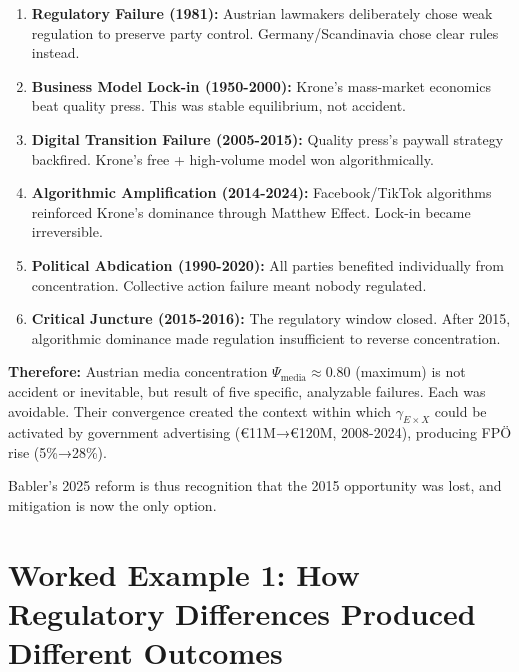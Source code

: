 {\begin{enumerate}
\item \textbf{Regulatory Failure (1981):} Austrian lawmakers deliberately chose weak regulation
  to preserve party control. Germany/Scandinavia chose clear rules instead.

\item \textbf{Business Model Lock-in (1950-2000):} Krone's mass-market economics beat quality
  press. This was stable equilibrium, not accident.

\item \textbf{Digital Transition Failure (2005-2015):} Quality press's paywall strategy backfired.
  Krone's free + high-volume model won algorithmically.

\item \textbf{Algorithmic Amplification (2014-2024):} Facebook/TikTok algorithms reinforced
  Krone's dominance through Matthew Effect. Lock-in became irreversible.

\item \textbf{Political Abdication (1990-2020):} All parties benefited individually from concentration.
  Collective action failure meant nobody regulated.

\item \textbf{Critical Juncture (2015-2016):} The regulatory window closed. After 2015,
  algorithmic dominance made regulation insufficient to reverse concentration.
\end{enumerate}

\textbf{Therefore:} Austrian media concentration $\Psi_{\text{media}} \approx 0.80$ (maximum)
is not accident or inevitable, but result of five specific, analyzable failures. Each was avoidable.
Their convergence created the context within which $\gamma_{E \times X}$ could be activated by
government advertising (€11M→€120M, 2008-2024), producing FPÖ rise (5\%→28\%).

Babler's 2025 reform is thus recognition that the 2015 opportunity was lost, and mitigation
is now the only option.


\section*{Worked Example 1: How Regulatory Differences Produced Different Outcomes}

}

